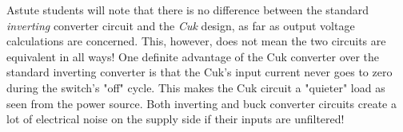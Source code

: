 Astute students will note that there is no difference between the standard {\it inverting} converter circuit and the {\it Cuk} design, as far as output voltage calculations are concerned.  This, however, does not mean the two circuits are equivalent in all ways!  One definite advantage of the Cuk converter over the standard inverting converter is that the Cuk's input current never goes to zero during the switch's "off" cycle.  This makes the Cuk circuit a "quieter" load as seen from the power source.  Both inverting and buck converter circuits create a lot of electrical noise on the supply side if their inputs are unfiltered!




